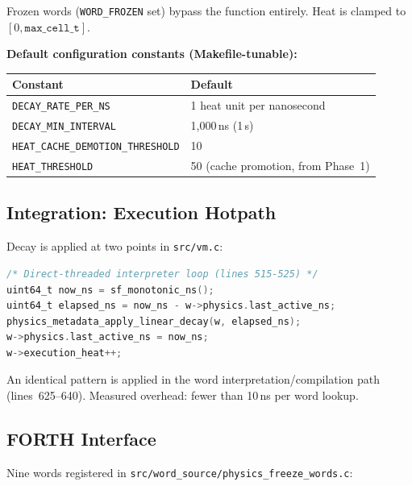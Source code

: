 Frozen words (\texttt{WORD\_FROZEN} set) bypass the function entirely.
Heat is clamped to $[0, \texttt{max\_cell\_t}]$.

\textbf{Default configuration constants (Makefile-tunable):}

\begin{center}
\begin{tabular}{ll}
\toprule
Constant & Default \\
\midrule
\texttt{DECAY\_RATE\_PER\_NS}          & 1 heat unit per nanosecond \\
\texttt{DECAY\_MIN\_INTERVAL}          & 1,000\,ns (1\,\textmu{}s) \\
\texttt{HEAT\_CACHE\_DEMOTION\_THRESHOLD} & 10 \\
\texttt{HEAT\_THRESHOLD}               & 50 (cache promotion, from Phase~1) \\
\bottomrule
\end{tabular}
\end{center}

\subsection{Integration: Execution Hotpath}

Decay is applied at two points in \texttt{src/vm.c}:

\begin{lstlisting}[language=C]
/* Direct-threaded interpreter loop (lines 515-525) */
uint64_t now_ns = sf_monotonic_ns();
uint64_t elapsed_ns = now_ns - w->physics.last_active_ns;
physics_metadata_apply_linear_decay(w, elapsed_ns);
w->physics.last_active_ns = now_ns;
w->execution_heat++;
\end{lstlisting}

An identical pattern is applied in the word interpretation/compilation
path (lines~625--640). Measured overhead: fewer than 10\,ns per word
lookup.

\subsection{FORTH Interface}

Nine words registered in
\texttt{src/word\_source/physics\_freeze\_words.c}:


